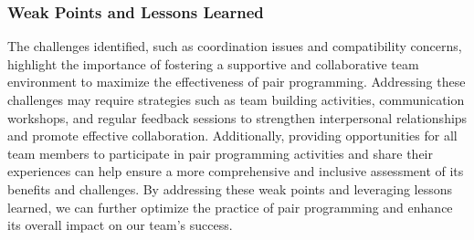 \subsubsection{Weak Points and Lessons Learned} 
The challenges identified, such as coordination issues and compatibility concerns, highlight the importance of fostering a supportive and collaborative team environment to maximize the effectiveness of pair programming. Addressing these challenges may require strategies such as team building activities, communication workshops, and regular feedback sessions to strengthen interpersonal relationships and promote effective collaboration. Additionally, providing opportunities for all team members to participate in pair programming activities and share their experiences can help ensure a more comprehensive and inclusive assessment of its benefits and challenges. By addressing these weak points and leveraging lessons learned, we can further optimize the practice of pair programming and enhance its overall impact on our team's success.
